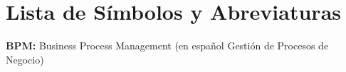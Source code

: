 \chapter*{Lista de Símbolos y Abreviaturas}%

\vspace{5 mm}
\noindent
\textbf{BPM:} Business Process Management (en español Gestión de Procesos de Negocio)\\ \\
